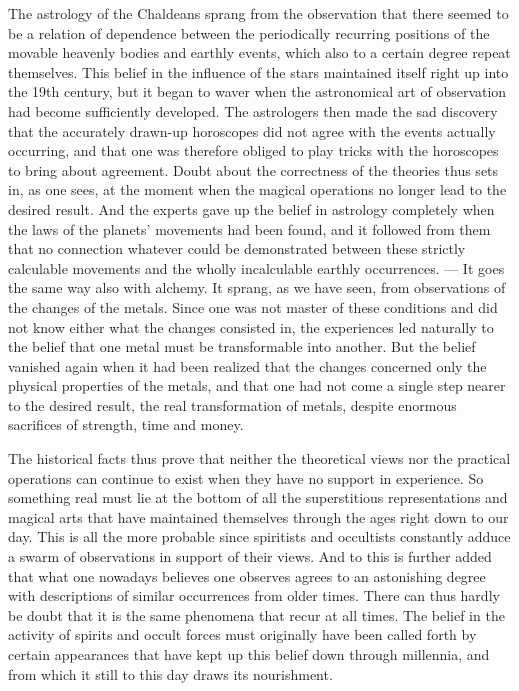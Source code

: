 \documentclass[12pt,a4paper,openany]{book}
\newcommand{\opage}[1]{\marginnote{\footnotesize\textit{[#1]}}}
\begin{document}
The astrology of the Chaldeans sprang from the observation that there
seemed to be a relation of dependence between the periodically recurring positions
of the movable heavenly bodies and earthly
events, which also to a certain degree repeat themselves.
This belief in the influence of the stars maintained itself right up into the
19th century, but it began to waver when the astronomical
art of observation had become sufficiently developed.
The astrologers then made the sad discovery that the accurately
drawn-up horoscopes did not agree with the events actually occurring,
and that one was therefore obliged to play
tricks with the horoscopes to bring about agreement.
Doubt about the correctness of the theories thus sets in,
as one sees, at the moment when the magical operations no
longer lead to the desired result. And the experts gave up
the belief in astrology completely when the laws of the planets'
movements had been found, and it followed from them that
no connection whatever could be demonstrated between these
strictly calculable movements and the wholly incalculable
earthly occurrences. --- It goes the same way also
with alchemy. It sprang, as we have seen, from observations
of the changes of the metals. Since one was not master
of these conditions and did not know either what the changes
consisted in, the experiences led naturally to the belief that
one metal must be transformable into another. But
\setcounter{footnote}{0}%
\opage{285}the belief vanished again when it had been realized that the changes
concerned only the physical properties of the metals, and that one
had not come a single step nearer to the desired result, the real transformation of metals,
despite enormous sacrifices of
strength, time and money.

The historical facts thus prove that neither
the theoretical views nor the practical operations can
continue to exist when they have no support in experience.
So something real must lie at the bottom of all the
superstitious representations and magical arts that have
maintained themselves through the ages right down to our day. This is
all the more probable since spiritists and occultists
constantly adduce a swarm of observations in support of
their views. And to this is further added that what
one nowadays believes one observes agrees to an astonishing degree
with descriptions of similar occurrences from older
times. There can thus hardly be doubt that it is the same
phenomena that recur at all times. The belief in the activity of spirits
and occult forces must originally have been
called forth by certain appearances that have kept up
this belief down through millennia, and from which it still
to this day draws its nourishment.
\end{document}
